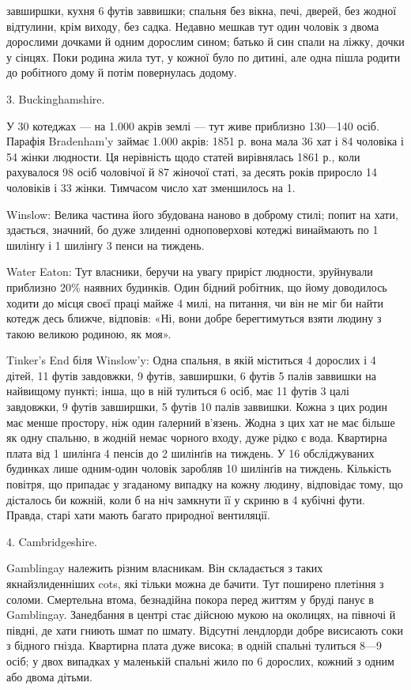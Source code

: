 \parcont{}  %
завширшки, кухня 6 футів заввишки; спальня без вікна, печі,
дверей, без жодної відтулини, крім виходу, без садка. Недавно
мешкав тут один чоловік з двома дорослими дочками й одним
дорослим сином; батько й син спали на ліжку, дочки у сінцях.
Поки родина жила тут, у кожної було по дитині, але одна пішла
родити до робітного дому й потім повернулась додому.

3. Buckinghamshire.

У 30 котеджах — на 1.000 акрів землі — тут живе приблизно
130—140 осіб. Парафія Bradenham’y займає 1.000 акрів: 1851 р.
вона мала 36 хат і 84 чоловіка і 54 жінки людности. Ця нерівність
щодо статей вирівнялась 1861 р., коли рахувалося 98 осіб
чоловічої й 87 жіночої статі, за десять років приросло 14 чоловіків
і 33 жінки. Тимчасом число хат зменшилось на 1.

Winslow: Велика частина його збудована наново в доброму
стилі; попит на хати, здається, значний, бо дуже злиденні одноповерхові
котеджі винаймають по 1 шилінґу і 1 шилінґу 3 пенси
на тиждень.

Water Eaton: Тут власники, беручи на увагу приріст людности,
зруйнували приблизно 20\% наявних будинків. Один бідний
робітник, що йому доводилось ходити до місця своєї праці
майже 4 милі, на питання, чи він не міг би найти котедж десь
ближче, відповів: «Ні, вони добре берегтимуться взяти людину
з  такою великою родиною, як моя».

Tinker’s End біля Winslow’y: Одна спальня, в якій міститься
4 дорослих і 4 дітей, 11 футів завдовжки, 9 футів, завширшки,
6 футів 5 палів заввишки на найвищому пункті; інша, що в ній
тулиться 6 осіб, має 11 футів 3 цалі завдовжки, 9 футів завширшки,
5 футів 10 палів заввишки. Кожна з цих родин має менше
простору, ніж один ґалерний в’язень. Жодна з цих хат не має
більше як одну спальню, в жодній немає чорного входу, дуже
рідко є вода. Квартирна плата від 1 шилінґа 4 пенсів до 2 шилінґів
на тиждень. У 16 обсліджуваних будинках лише одним-один
чоловік заробляв 10 шилінґів на тиждень. Кількість повітря, що
припадає у згаданому випадку на кожну людину, відповідає
тому, що дісталось би кожній, коли б на ніч замкнути її у скриню
в 4 кубічні фути. Правда, старі хати мають багато природної
вентиляції.

4. Cambridgeshire.

Gamblingay належить різним власникам. Він складається з
таких якнайзлиденніших cots, які тільки можна де бачити.
Тут поширено плетіння з соломи. Смертельна втома, безнадійна
покора перед життям у бруді панує в Gamblingay. Занедбання
в центрі стає дійсною мукою на околицях, на півночі й півдні, де
хати гниють шмат по шмату. Відсутні лендлорди добре висисають
соки з бідного гнізда. Квартирна плата дуже висока;
в одній спальні тулиться 8—9 осіб; у двох випадках у маленькій
спальні жило по 6 дорослих, кожний з одним або двома дітьми.
\parbreak{}  %
